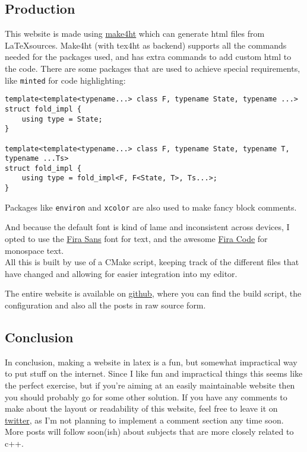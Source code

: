 \documentclass{article}
\begin{document}
\subsection*{Production}
This website is made using \href{https://github.com/michal-h21/make4ht}{make4ht}
which can generate html files from \LaTeX sources. Make4ht (with tex4ht as backend) supports all the
commands needed for the packages used, and has extra commands to add custom html to the code.
There are some packages that are used to achieve special requirements, like \verb|minted| for code
highlighting:
\begin{verbatim}
template<template<typename...> class F, typename State, typename ...>
struct fold_impl {
    using type = State;
}

template<template<typename...> class F, typename State, typename T, typename ...Ts>
struct fold_impl {
    using type = fold_impl<F, F<State, T>, Ts...>;
}
\end{verbatim}
Packages like \verb|environ| and \verb|xcolor| are also used to make fancy block comments.
\begin{comment}
Like this one
\end{comment}
And because the default font is kind of lame and inconsistent across devices, I opted to use
the \href{http://mozilla.github.io/Fira/}{Fira Sans} font for text,
and the awesome \href{https://github.com/tonsky/FiraCode}{Fira Code} for monospace text.\\
All this is built by use of a CMake script, keeping track of the different files that have
changed and allowing for easier integration into my editor.

The entire website is available on \href{https://github.com/chieltbest/website}{github}, where
you can find the build script, the configuration and also all the posts in raw source form.

\subsection*{Conclusion}
In conclusion, making a website in latex is a fun, but somewhat impractical way to put stuff on
the internet. Since I like fun and impractical things this seems like the perfect exercise, but
if you're aiming at an easily maintainable website then you should probably go for some other
solution. If you have any comments to make about the layout or readability of this website, feel
free to leave it on \href{https://twitter.com/chieltbest}{twitter}, as I'm not planning to
implement a comment section any time soon.\\
More posts will follow soon(ish) about subjects that are more closely related to c++.
\end{document}

